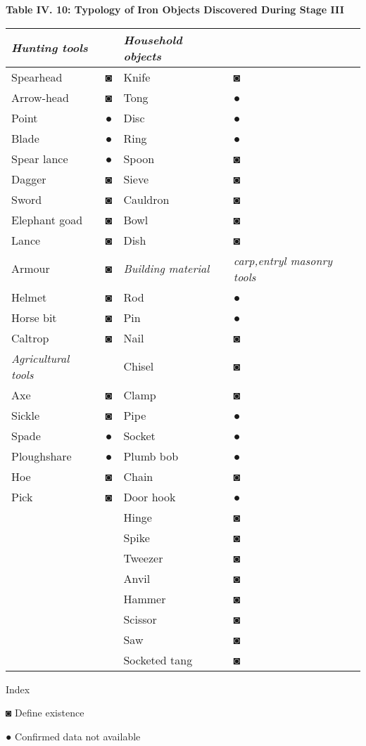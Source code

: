 \textbf{Table IV. 10: Typology of Iron Objects Discovered During Stage III}

\begin{longtable}{|l|l|l|l|}
\hline
\textit{Hunting tools} &  & \textit{Household objects} &  \\
\hline
Spearhead & ◙ & Knife & ◙ \\
\hline
Arrow-head & ◙ & Tong & ● \\
\hline
Point & ● & Disc & ● \\
\hline
Blade & ● & Ring & ● \\
\hline
Spear lance & ● & Spoon & ◙ \\
\hline
Dagger & ◙ & Sieve & ◙ \\
\hline
Sword & ◙ & Cauldron & ◙ \\
\hline
Elephant goad & ◙ & Bowl & ◙ \\
\hline
Lance & ◙ & Dish & ◙ \\
\hline
Armour & ◙ & \textit{Building material} & \textit{carp,entryl masonry tools} &  \\
\hline
Helmet & ◙ & Rod & ● \\
\hline
Horse bit & ◙ & Pin & ● \\
\hline
Caltrop & ◙ & Nail & ◙ \\
\hline
\textit{Agricultural tools} &  & Chisel & ◙ \\
\hline
Axe & ◙ & Clamp & ◙ \\
\hline
Sickle & ◙ & Pipe & ● \\
\hline
Spade & ● & Socket & ● \\
\hline
Ploughshare & ● & Plumb bob & ● \\
\hline
Hoe & ◙ & Chain & ◙ \\
\hline
Pick & ◙ & Door hook & ● \\
\hline
 &  & Hinge & ◙ \\
\hline
 &  & Spike & ◙ \\
\hline
 &  & Tweezer & ◙ \\
\hline
 &  & Anvil & ◙ \\
\hline
 &  & Hammer & ◙ \\
\hline
 &  & Scissor & ◙ \\
\hline
 &  & Saw & ◙ \\
\hline
 &  & Socketed tang & ◙ \\
\hline
\end{longtable}

Index

◙ Define existence

● Confirmed data not available


